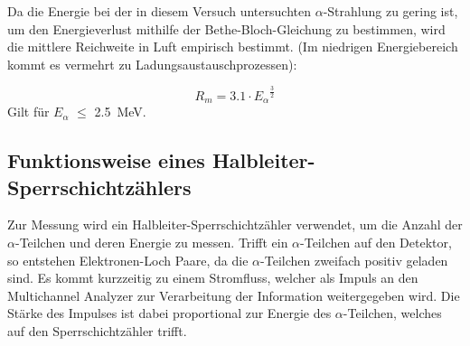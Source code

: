 Da die Energie bei der in diesem Versuch untersuchten $\alpha$-Strahlung zu gering ist, um den Energieverlust mithilfe der Bethe-Bloch-Gleichung zu bestimmen, wird die mittlere Reichweite in Luft empirisch bestimmt. (Im niedrigen Energiebereich kommt es vermehrt zu Ladungsaustauschprozessen):

\begin{equation}
\label{eq:reichweite}
R_m = 3.1 \cdot {E_\alpha} ^{\frac{3}{2}}
\end{equation}
Gilt für $E_{\alpha}$ $\le$ \SI{2.5}{\mega\electronvolt}.

\subsection{Funktionsweise eines Halbleiter-Sperrschichtzählers}

Zur Messung wird ein Halbleiter-Sperrschichtzähler verwendet, um
die Anzahl der $\alpha$-Teilchen und deren Energie zu messen. Trifft ein $\alpha$-Teilchen auf den Detektor, so entstehen Elektronen-Loch
Paare, da die $\alpha$-Teilchen zweifach positiv geladen sind. Es kommt kurzzeitig zu einem Stromfluss, welcher als Impuls an den Multichannel Analyzer zur Verarbeitung der Information weitergegeben wird. Die Stärke des Impulses ist dabei proportional zur Energie des $\alpha$-Teilchen, welches auf den Sperrschichtzähler trifft.
